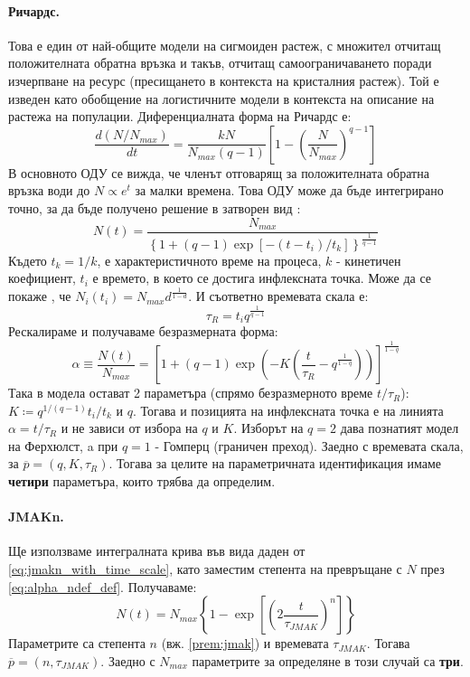 \paragraph{Ричардс.} Това е един от най-общите модели на сигмоиден растеж, с множител отчитащ положителната обратна връзка и такъв, отчитащ самоограничаването поради изчерпване на ресурс (пресищането в контекста на кристалния растеж). Той е изведен като обобщение на логистичните модели в контекста на описание на растежа на популации. Диференциалната форма на Ричардс е:
\begin{equation}
    \label{eq:richards_diff_form}
    \frac{d(N/N_{max})}{dt} = \frac{k N}{N_{max}(q-1)}\left[ 1 - \left(\frac{N}{N_{max}}\right)^{q-1} \right]
\end{equation}
В основното ОДУ се вижда, че членът отговарящ за положителната обратна връзка води до $N \propto e^t$ за малки времена. Това ОДУ може да бъде интегрирано точно, за да бъде получено решение в затворен вид \cite{Richards1959}:
\begin{equation}
    \label{eq:richards_int_form}
    N(t) = \frac{N_{max}}{\left\{1 + (q-1)\exp{\left[ - (t-t_{i})/t_k \right]}\right\}^{\frac{1}{q-1}}}
\end{equation}
Където $t_k = 1/k$, е характеристичното време на процеса, $k$ - кинетичен коефициент, $t_{i}$ е времето, в което се достига инфлексната точка. Може да се покаже \cite{Tjrve2010}, че $N_i (t_i) = N_{max} d ^ {\frac{1}{1-d}}$. И съответно времевата скала е:
\begin{equation*}
    \tau_R = t_i q ^ {\frac{1}{q-1}}
\end{equation*}
Рескалираме и получаваме безразмерната форма:
\begin{equation*}
    \alpha \equiv \frac{N(t)}{N_{max}} = \left[ 1 + (q-1) \exp{\left( -K \left( \frac{t}{\tau_R} - q ^ {\frac{1}{1-q}} \right) \right)} \right] ^ {\frac{1}{1-q}}
\end{equation*}
Така в модела остават 2 параметъра (спрямо безразмерното време $t/\tau_R$): $K \coloneqq q^{1/(q-1)} t_i / t_k$ и $q$. Тогава и позицията на инфлексната точка е на линията $\alpha = t/\tau_R$ и не зависи от избора на $q$ и $K$.
Изборът на $q = 2$ дава познатият модел на Ферхюлст, a при $q = 1$ - Гомперц (граничен преход). Заедно с времевата скала, за
$\overline{p} = (q, K, \tau_R)$. Тогава за целите на параметричната идентификация имаме \textbf{четири} параметъра, които трябва да определим.

\paragraph{JMAKn.} Ще използваме интегралната крива във вида даден от \autoref{eq:jmakn_with_time_scale}, като заместим степента на превръщане с $N$ през \autoref{eq:alpha_ndef_def}. Получаваме:
\begin{equation}
    \label{eq:jmakn_intform_n}
    N(t) = N_{max} \left\{ 1 - \exp{\left[  \left( 2 \frac{t}{\tau_{JMAK}} \right)^n \right]} \right\}
\end{equation}
Параметрите са степента $n$ (вж. \autoref{prem:jmak}) и времевата $\tau_{JMAK}$. Тогава $\overline{p} = (n, \tau_{JMAK})$. Заедно с $N_{max}$ параметрите за определяне в този случай са \textbf{три}.

